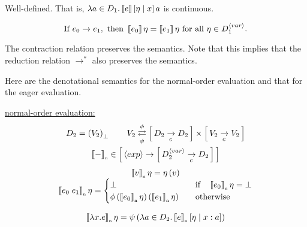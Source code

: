 \begin{enumcirc}
\[\begin{array}{c}
		\end{array}
	\]
	\begin{property}[Textbook 10.8]
		\;\\
		Well-defined. That is,
		$\lambda a \in D_1 . \left\llbracket e \right\rrbracket\left[ \eta \; \middle\vert \; x \right]{a}$
		is continuous.
	\end{property}
	\begin{property}
		\[
			\textrm{If } e_0 \rightarrow e_1, \textrm{ then }
			\left\llbracket e_0 \right\rrbracket\eta = \left\llbracket e_1 \right\rrbracket\eta \textrm{ for all } \eta \in D_1^{\left\langle var \right\rangle}.
		\]
	\end{property}
	The contraction relation preserves the semantics.
	Note that this implies that the reduction relation $\rightarrow^*$ also
	preserves the semantics.
	\item
	Here are the denotational semantics for the normal-order evaluation and that
	for the eager evaluation.

	\ul{normal-order evaluation:}
	\[
		\begin{array}{c}
			\displaystyle
			D_2 = \left( V_2 \right)_\bot \qquad
			V_2 \mathrel{\mathop{\rightleftarrows}^{\mathrm{\phi}}_{\mathrm{\psi}}} \left[ \, D_2 \xrightarrow[c]{} D_2 \, \right] \times \left[ \, V_2 \xrightarrow[c]{} V_2 \, \right]                                                                        \\[1em]
			\left\llbracket - \right\rrbracket_{\textrm{\tiny n}} \in \left[ \, \left\langle exp \right\rangle \rightarrow \left[ \,  D_2^{\left\langle var \right\rangle} \xrightarrow[c]{} D_2  \, \right] \, \right]                                                           \\[1em]
			\left\llbracket v \right\rrbracket_{\textrm{\tiny n}}\eta = \eta\left( v \right)                                                                                                                            \\
			\left\llbracket e_0 \; e_1 \right\rrbracket_{\textrm{\tiny n}}\eta = \begin{cases}
				                             \bot                                                       & \quad \textrm{if} \quad \left\llbracket e_0 \right\rrbracket_{\textrm{\tiny n}}\eta = \bot \\
				                             \phi\left( \left\llbracket e_0 \right\rrbracket_{\textrm{\tiny n}}\eta \right)\left( \left\llbracket e_1 \right\rrbracket_{\textrm{\tiny n}}\eta \right) & \quad \textrm{otherwise}                           \\
			                             \end{cases} \\[2em]
			\left\llbracket \lambda x. e \right\rrbracket_{\textrm{\tiny n}}\eta = \psi\left( \lambda a \in D_2 . \left\llbracket e \right\rrbracket_{\textrm{\tiny n}}\left[ \eta \; \middle\vert \; x:a \right] \right)                                                                  \\
		\end{array}
	\]


\end{enumcirc}
